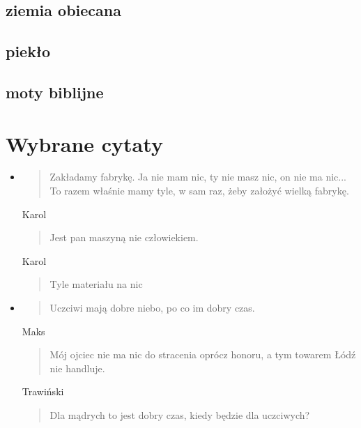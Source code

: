 \documentclass{article}
\begin{document}
\subsection{ziemia obiecana}
\subsection{piekło}
\subsection{moty biblijne}
\pagebreak
\section{Wybrane cytaty}
\begin{itemize}
    \item \begin{quote}
        Zakładamy fabrykę. Ja nie mam nic, ty nie masz nic, on nie ma nic... To razem właśnie mamy tyle, w sam raz, żeby założyć wielką fabrykę.
    \end{quote}
    \item[Karol] \begin{quote}
        Jest pan maszyną nie człowiekiem.    
    \end{quote}
    \item[Karol] \begin{quote}
        Tyle materiału na nic
    \end{quote}
    \item \begin{quote}
        Uczciwi mają dobre niebo, po co im dobry czas.
    \end{quote}
    \item[Maks] \begin{quote}
        Mój ojciec nie ma nic do stracenia oprócz honoru, a tym towarem Łódź nie handluje.
    \end{quote}
    \item[Trawiński] \begin{quote}
        Dla mądrych to jest dobry czas, kiedy będzie dla uczciwych?
    \end{quote}
\end{itemize}
\end{document}
